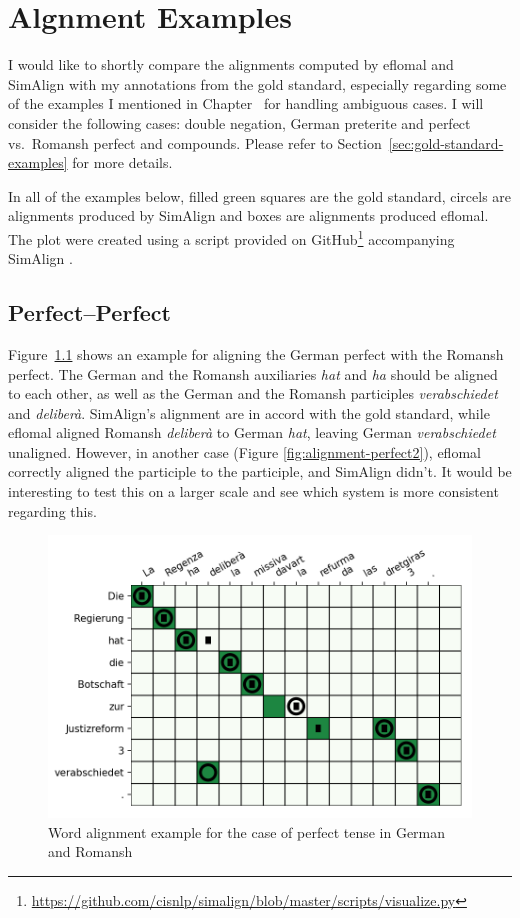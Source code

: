 \chapter{Algnment Examples}\label{appendix-a}

I would like to shortly compare the  alignments computed by eflomal and SimAlign with my annotations from the gold standard, especially regarding some of the examples I mentioned in Chapter~ for handling ambiguous cases.
I will consider the following cases: double negation, German preterite and perfect vs.~Romansh perfect and compounds. 
Please refer to Section~\ref{sec:gold-standard-examples} for more details.

In all of the examples below, filled green squares are the gold standard, circels are alignments produced by SimAlign and boxes are alignments produced eflomal. 
The plot were created using a script provided on GitHub\footnote{\url{https://github.com/cisnlp/simalign/blob/master/scripts/visualize.py}} accompanying SimAlign \autocite{jalili-sabet-etal-2020-simalign}.

\section{Perfect--Perfect}
Figure~\ref{fig:alignment-perfect} shows an example for aligning the German perfect with the Romansh perfect. 
The German and the Romansh auxiliaries \emph{hat} and \emph{ha} should be aligned to each other, as well as the German and the Romansh participles \emph{verabschiedet} and \emph{deliberà}. 
SimAlign's alignment are in accord with the gold standard, while eflomal aligned Romansh \emph{deliberà} to German \emph{hat}, leaving German \emph{verabschiedet} unaligned. However, in another case (Figure \ref{fig:alignment-perfect2}), eflomal correctly aligned the participle to the participle, and SimAlign didn't. 
It would be interesting to test this on a larger scale and see which system is more consistent regarding this.

\begin{figure}[ht]
\includegraphics{graphics/alignments/example1.png}
\caption{Word alignment example for the case of perfect tense in German and Romansh}\label{fig:alignment-perfect}
\end{figure}

